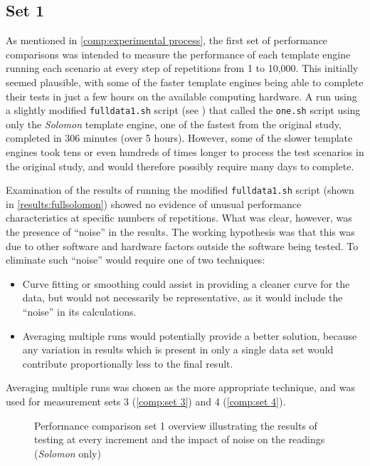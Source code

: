 \subsection{Set 1}
\label{comp:set 1}

As mentioned in \autoref{comp:experimental process}, the first set of performance comparisons was intended to measure the performance of each \gls{template engine} running each scenario at every step of repetitions from 1 to 10,000. This initially seemed plausible, with some of the faster \gls{template engine}s being able to complete their tests in just a few hours on the available computing hardware. A run using a slightly modified \texttt{fulldata1.sh} script  (see ) that called the \texttt{one.sh} script using only the \emph{Solomon} \gls{template engine}, one of the fastest from the original study, completed in 306 minutes (over 5 hours). However, some of the slower \gls{template engine}s took tens or even hundreds of times longer to process the test scenarios in the original study, and would therefore possibly require many days to complete.

Examination of the results of running the modified \texttt{fulldata1.sh} script (shown in \autoref{results:fullsolomon}) showed no evidence of unusual performance characteristics at specific numbers of repetitions. What was clear, however, was the presence of \enquote{noise} in the results. The working hypothesis was that this was due to other software and hardware factors outside the software being tested. To eliminate such \enquote{noise} would require one of two techniques:

\begin{itemize}
    \item Curve fitting or smoothing could assist in providing a cleaner curve for the data, but would not necessarily be representative, as it would include the \enquote{noise} in its calculations.
    \item Averaging multiple runs would potentially provide a better solution, because any variation in results which is present in only a single data set would contribute proportionally less to the final result.
\end{itemize}

Averaging multiple runs was chosen as the more appropriate technique, and was used for measurement sets 3 (\autoref{comp:set 3}) and 4 (\autoref{comp:set 4}).
 
\begin{figure}[!p]
\centering

\caption{\label{results:fullsolomon}Performance comparison set 1 overview illustrating the results of testing at every increment and the impact of noise on the readings (\emph{Solomon} only)}
\end{figure}

